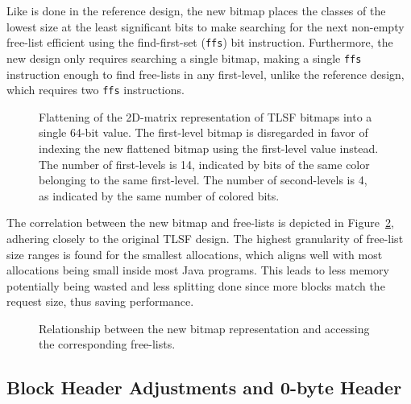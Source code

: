 Like is done in the reference design, the new bitmap places the classes of the lowest size at the least significant bits to make searching for the next non-empty free-list efficient using the find-first-set (\texttt{ffs}) bit instruction. Furthermore, the new design only requires searching a single bitmap, making a single \texttt{ffs} instruction enough to find free-lists in any first-level, unlike the reference design, which requires two \texttt{ffs} instructions.

\begin{figure}[h]
    \centering
    
    \vspace*{4mm}
    \caption{Flattening of the 2D-matrix representation of TLSF bitmaps into a single 64-bit value. The first-level bitmap is disregarded in favor of indexing the new flattened bitmap using the first-level value instead. The number of first-levels is 14, indicated by bits of the same color belonging to the same first-level. The number of second-levels is 4, as indicated by the same number of colored bits.}
    \label{fig:bitmap_flattening}
\end{figure}

The correlation between the new bitmap and free-lists is depicted in Figure~\ref{fig:bitmap_relationship}, adhering closely to the original TLSF design. The highest granularity of free-list size ranges is found for the smallest allocations, which aligns well with most allocations being small inside most Java programs. This leads to less memory potentially being wasted and less splitting done since more blocks match the request size, thus saving performance.

\begin{figure}[h]
    \centering
    \vspace*{0.2cm}
    
    \vspace*{1mm}
    \caption{Relationship between the new bitmap representation and accessing the corresponding free-lists.}
    \label{fig:bitmap_relationship}
\end{figure}

\subsection{Block Header Adjustments and 0-byte Header}
\label{sec:adaptations_impl:0-byte-header}

